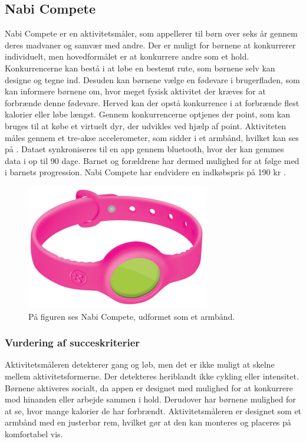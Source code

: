 \subsection{Nabi Compete}
Nabi Compete er en aktivitetsmåler, som appellerer til børn over seks år gennem deres madvaner og samvær med andre. Der er muligt for børnene at konkurrerer individuelt, men hovedformålet er at konkurrere andre som et hold. Konkurrencerne kan bestå i at løbe en bestemt rute, som børnene selv kan designe og tegne ind. Desuden kan børnene vælge en fødevare i brugerfladen, som kan informere børnene om, hvor meget fysisk aktivitet der kræves for at forbrænde denne fødevare. Herved kan der opstå konkurrence i at forbrænde flest kalorier eller løbe længst. %
 Gennem konkurrencerne optjenes der point, som kan bruges til at købe et virtuelt dyr, der udvikles ved hjælp af point. 
Aktiviteten måles gennem et tre-akse accelerometer, som sidder i et armbånd, hvilket kan ses på . Dataet synkroniseres til en app gennem bluetooth, hvor der kan gemmes data i op til 90 dage. Barnet og forældrene har dermed mulighed for at følge med i barnets progression. 
Nabi Compete har endvidere en indkøbspris på 190 kr \citep{Fuhu2015,Fuhu_tech2015}. 

\begin{figure}[H]
	\centering
	\includegraphics[scale=0.8]{figures/aProblemanalyse/nabi.png}
	\caption{På figuren ses Nabi Compete, udformet som et armbånd. \citep{Perez2015}}
	\label{fig:nabi}
\end{figure}

\subsubsection{Vurdering af succeskriterier}
Aktivitetsmåleren detekterer gang og løb, men det er ikke muligt at skelne mellem aktivitetsformerne. Der detekteres heriblandt ikke cykling eller intensitet. Børnene aktiveres socialt, da appen er designet med mulighed for at konkurrere mod hinanden eller arbejde sammen i hold. Derudover har børnene mulighed for %
at se, hvor mange kalorier de har forbrændt. Aktivitetsmåleren er designet som et armbånd med en justerbar rem, hvilket gør at den kan monteres og placeres på komfortabel vis.~\citep{Fuhu2015,Fuhu_tech2015}

